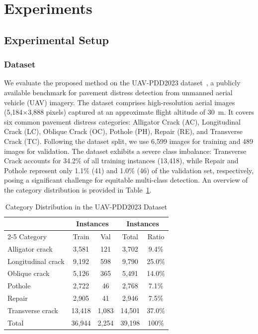 \section{Experiments}

\subsection{Experimental Setup}

\subsubsection{Dataset}
We evaluate the proposed method on the UAV-PDD2023 dataset~\cite{uav-pdd2023}, a publicly available benchmark for pavement distress detection from unmanned aerial vehicle (UAV) imagery. The dataset comprises high-resolution aerial images (5,184$\times$3,888 pixels) captured at an approximate flight altitude of 30~m. It covers six common pavement distress categories: Alligator Crack (AC), Longitudinal Crack (LC), Oblique Crack (OC), Pothole (PH), Repair (RE), and Transverse Crack (TC). Following the dataset split, we use 6,599 images for training and 489 images for validation. The dataset exhibits a severe class imbalance: Transverse Crack accounts for 34.2\% of all training instances (13,418), while Repair and Pothole represent only 1.1\% (41) and 1.0\% (46) of the validation set, respectively, posing a significant challenge for equitable multi-class detection. An overview of the category distribution is provided in Table~\ref{tab:dataset}.

\begin{table}[!t]
\caption{Category Distribution in the UAV-PDD2023 Dataset}
\label{tab:dataset}
\centering
\setlength{\tabcolsep}{4pt}
\begin{tabular}{l|c|c|c|c}
\hline
\hline
\multicolumn{1}{c|}{} & \multicolumn{2}{c|}{Instances} & \multicolumn{2}{c}{Instances} \\
\cline{2-5}
Category & Train & Val & Total & Ratio \\
\hline
Alligator crack    & 3,581  & 121  & 3,702  & 9.4\%  \\
Longitudinal crack & 9,192  & 598  & 9,790  & 25.0\% \\
Oblique crack      & 5,126  & 365  & 5,491  & 14.0\% \\
Pothole            & 2,722  & 46   & 2,768  & 7.1\%  \\
Repair             & 2,905  & 41   & 2,946  & 7.5\%  \\
Transverse crack   & 13,418 & 1,083& 14,501 & 37.0\% \\
\hline
Total              & 36,944 & 2,254& 39,198 & 100\%  \\
\hline
\end{tabular}
\end{table}

